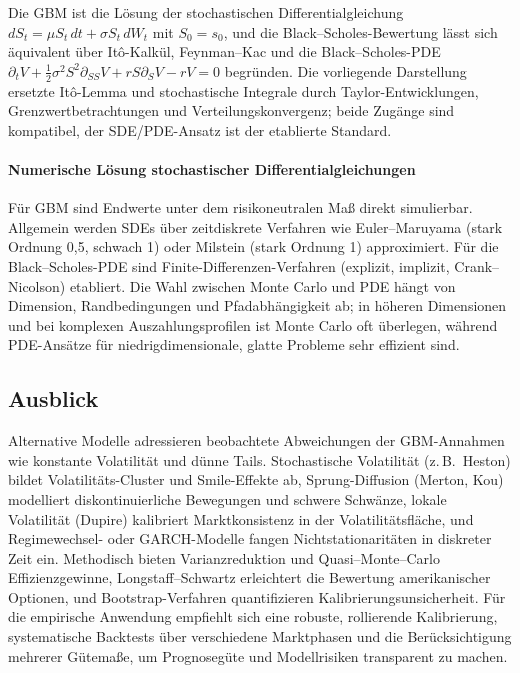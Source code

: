 Die GBM ist die Lösung der stochastischen Differentialgleichung
$dS_t=\mu S_t\,dt+\sigma S_t\,dW_t$ mit $S_0=s_0$,
und die Black–Scholes-Bewertung lässt sich äquivalent über It\^o-Kalkül, Feynman–Kac und die Black–Scholes-PDE
$\partial_t V+\tfrac12\sigma^2 S^2 \partial_{SS}V + r S \partial_S V - r V=0$
begründen. Die vorliegende Darstellung ersetzte It\^o-Lemma und stochastische Integrale durch Taylor-Entwicklungen, Grenzwertbetrachtungen und 
Verteilungskonvergenz; beide Zugänge sind kompatibel, der SDE/PDE-Ansatz ist der etablierte Standard. 

\paragraph{Numerische Lösung stochastischer Differentialgleichungen}
Für GBM sind Endwerte unter dem risikoneutralen Maß direkt simulierbar. Allgemein werden SDEs über 
zeitdiskrete Verfahren wie Euler–Maruyama (stark Ordnung 0{,}5, schwach 1) oder 
Milstein (stark Ordnung 1) approximiert. Für die Black–Scholes-PDE sind 
Finite-Differenzen-Verfahren (explizit, implizit, Crank–Nicolson) etabliert. Die Wahl zwischen 
Monte Carlo und PDE hängt von Dimension, Randbedingungen und Pfadabhängigkeit ab; in höheren 
Dimensionen und bei komplexen Auszahlungsprofilen ist Monte Carlo oft überlegen, während 
PDE-Ansätze für niedrigdimensionale, glatte Probleme sehr effizient sind.

\subsection{Ausblick}

Alternative Modelle adressieren beobachtete Abweichungen der GBM-Annahmen wie konstante Volatilität
und dünne Tails. Stochastische Volatilität (z.\,B.\ Heston) bildet Volatilitäts-Cluster und 
Smile-Effekte ab, Sprung-Diffusion (Merton, Kou) modelliert diskontinuierliche Bewegungen und 
schwere Schwänze, lokale Volatilität (Dupire) kalibriert Marktkonsistenz in der Volatilitätsfläche,
und Regimewechsel- oder GARCH-Modelle fangen Nichtstationaritäten in diskreter Zeit ein. 
Methodisch bieten Varianzreduktion und Quasi–Monte–Carlo Effizienzgewinne, Longstaff–Schwartz 
erleichtert die Bewertung amerikanischer Optionen, und Bootstrap-Verfahren 
quantifizieren Kalibrierungsunsicherheit. Für die empirische Anwendung empfiehlt sich eine 
robuste, rollierende Kalibrierung, systematische Backtests über verschiedene Marktphasen und die 
Berücksichtigung mehrerer Gütemaße, um Prognosegüte und Modellrisiken transparent zu machen.